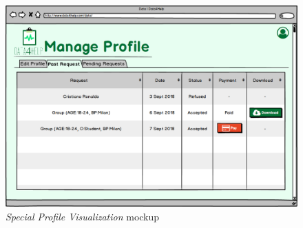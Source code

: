 \begin{figure}
\begin{center}
  \includegraphics[width=\textwidth]{img/mockup/Searched.png}
  \hspace{0.05\linewidth}
  \centering
  \caption{\textit{Special Profile Visualization} mockup}
  \label{img:specialProfileVisualization}
\end{center}
\end{figure}
